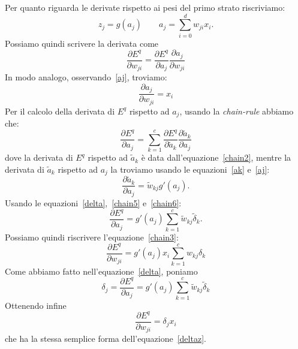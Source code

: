 \documentclass[11pt,a4paper,twoside,
openright]{book}
\begin{document}
Per quanto riguarda le derivate rispetto ai pesi del primo strato riscriviamo:
\begin{equation}
z_j=g(a_j) \qquad
 a_j=\sum\limits_{i=0}^d w_{ji}x_i.
\label{aj}
\end{equation}
Possiamo quindi scrivere la derivata come
\begin{equation}
\frac{\partial E^q}{\partial w_{ji}}=\frac{\partial E^q}{\partial a_j}\frac{\partial a_j}{\partial w_{ji}}
\label{chain3}
\end{equation}
In modo analogo, osservando~\eqref{aj}, troviamo:
\begin{equation}
\frac{\partial a_j}{\partial w_{ji}}=x_i
\label{chain4}
\end{equation}
Per il calcolo della derivata di $E^q$ rispetto ad $a_j$, usando la \textit{chain-rule} abbiamo che:
\begin{equation}
\frac{\partial E^q}{\partial a_j}=\sum\limits_{k=1}^c \frac{\partial E^q}{\partial \tilde{a}_k}\frac{\partial \tilde{a}_k}{\partial a_j}
\label{chain5}
\end{equation}
dove la derivata di $E^q$ rispetto ad $\tilde{a}_k$ è data dall'equazione~\eqref{chain2}, mentre la derivata di $\tilde{a}_k$ rispetto ad $a_j$ la troviamo usando le equazioni~\eqref{ak} e~\eqref{aj}:
\begin{equation}
\frac{\partial \tilde{a}_k}{\partial a_j}=\tilde{w}_{kj}g'(a_j).
\label{chain6}
\end{equation}
Usando le equazioni~\eqref{delta},~\eqref{chain5} e~\eqref{chain6}:
\begin{equation}
\frac{\partial E^q}{\partial a_{j}}=g'(a_j)\sum\limits_{k=1}^c \tilde{w}_{kj}\tilde{\delta}_k.
\label{chain7}
\end{equation}
Possiamo quindi riscrivere l'equazione~\eqref{chain3}:
\begin{equation}
\frac{\partial E^q}{\partial w_{ji}}=g'(a_j)x_i\sum\limits_{k=1}^c w_{kj}\delta_k
\label{chain8}
\end{equation}
Come abbiamo fatto nell'equazione~\eqref{delta}, poniamo
\begin{equation}
\delta_j = \frac{\partial E^q}{\partial a_j}=g'(a_j)\sum\limits_{k=1}^c \tilde{w}_{kj}\tilde{\delta}_k
\label{delta2}
\end{equation}
Ottenendo infine
\begin{equation}
\frac{\partial E^q}{\partial w_{ji}}=\delta_j x_i
\label{deltax}
\end{equation}
che ha la stessa semplice forma dell'equazione~\eqref{deltaz}.
\end{document}
